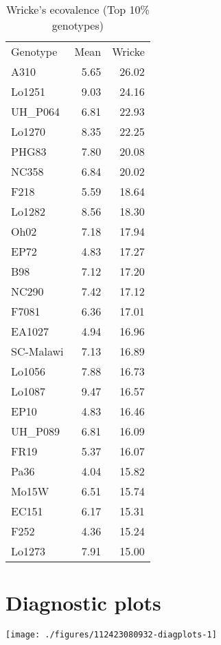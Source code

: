 \documentclass[a4paper,11pt]{article}\usepackage[]{graphicx}\usepackage[]{xcolor}
\makeatletter
\def\maxwidth{ %
  \ifdim\Gin@nat@width>\linewidth
    \linewidth
  \else
    \Gin@nat@width
  \fi
}
\newenvironment{knitrout}{}{} %
\makeatother
\begin{document}
\begin{table}[ht]
\begin{flushleft}
\caption{Wricke's ecovalence (Top 10\% genotypes)} 
\label{wricke}
\begin{tabular}{lrr}
 Genotype & Mean & Wricke \\ 
 A310 & 5.65 & 26.02 \\ 
  Lo1251 & 9.03 & 24.16 \\ 
  UH\_P064 & 6.81 & 22.93 \\ 
  Lo1270 & 8.35 & 22.25 \\ 
  PHG83 & 7.80 & 20.08 \\ 
  NC358 & 6.84 & 20.02 \\ 
  F218 & 5.59 & 18.64 \\ 
  Lo1282 & 8.56 & 18.30 \\ 
  Oh02 & 7.18 & 17.94 \\ 
  EP72 & 4.83 & 17.27 \\ 
  B98 & 7.12 & 17.20 \\ 
  NC290 & 7.42 & 17.12 \\ 
  F7081 & 6.36 & 17.01 \\ 
  EA1027 & 4.94 & 16.96 \\ 
  SC-Malawi & 7.13 & 16.89 \\ 
  Lo1056 & 7.88 & 16.73 \\ 
  Lo1087 & 9.47 & 16.57 \\ 
  EP10 & 4.83 & 16.46 \\ 
  UH\_P089 & 6.81 & 16.09 \\ 
  FR19 & 5.37 & 16.07 \\ 
  Pa36 & 4.04 & 15.82 \\ 
  Mo15W & 6.51 & 15.74 \\ 
  EC151 & 6.17 & 15.31 \\ 
  F252 & 4.36 & 15.24 \\ 
  Lo1273 & 7.91 & 15.00 \\ 
  \end{tabular}
\end{flushleft}
\end{table}


\clearpage
\section{Diagnostic plots}
\begin{knitrout}
\color{fgcolor}

\texttt{[image: ./figures/112423080932-diagplots-1]} \hfill{}


\end{knitrout}

\end{document}
